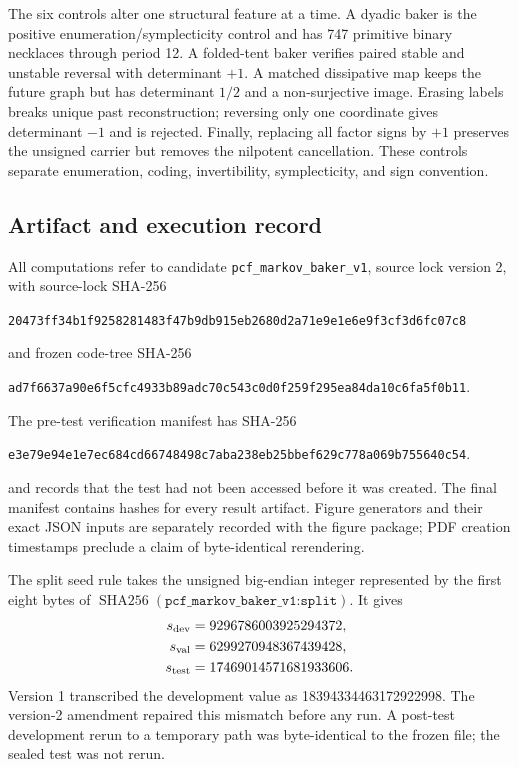 \documentclass[11pt]{article}
\theoremstyle{definition}
\theoremstyle{remark}
\begin{document}
The six controls alter one structural feature at a time.  A dyadic baker is
the positive enumeration/symplecticity control and has 747 primitive binary
necklaces through period 12.  A folded-tent baker verifies paired stable and
unstable reversal with determinant \(+1\).  A matched dissipative map keeps
the future graph but has determinant \(1/2\) and a non-surjective image.
Erasing labels breaks unique past reconstruction; reversing only one
coordinate gives determinant \(-1\) and is rejected.  Finally, replacing all
factor signs by \(+1\) preserves the unsigned carrier but removes the
nilpotent cancellation.  These controls separate enumeration, coding,
invertibility, symplecticity, and sign convention.

\subsection*{Artifact and execution record}

All computations refer to candidate \texttt{pcf\_markov\_baker\_v1}, source
lock version 2, with source-lock SHA-256
\begin{center}
\texttt{20473ff34b1f9258281483f47b9db915eb2680d2a71e9e1e6e9f3cf3d6fc07c8}
\end{center}
and frozen code-tree SHA-256
\begin{center}
\texttt{ad7f6637a90e6f5cfc4933b89adc70c543c0d0f259f295ea84da10c6fa5f0b11}.
\end{center}
The pre-test verification manifest has SHA-256
\begin{center}
\texttt{e3e79e94e1e7ec684cd66748498c7aba238eb25bbef629c778a069b755640c54}.
\end{center}
and records that the test had not been accessed before it was created.  The
final manifest contains hashes for every result artifact.  Figure generators
and their exact JSON inputs are separately recorded with the figure package;
PDF creation timestamps preclude a claim of byte-identical rerendering.

The split seed rule takes the unsigned big-endian integer represented by the
first eight bytes of
\(\operatorname{SHA256}(\texttt{pcf\_markov\_baker\_v1:split})\).  It gives
\begin{equation}
\begin{aligned}
 s_{\rm dev}&=9296786003925294372,\\
 s_{\rm val}&=6299270948367439428,\\
 s_{\rm test}&=17469014571681933606.
\end{aligned}
\label{eq:seeds}
\end{equation}
Version 1 transcribed the development value as 18394334463172922998.  The
version-2 amendment repaired this mismatch before any run.  A post-test
development rerun to a temporary path was byte-identical to the frozen file;
the sealed test was not rerun.
\end{document}
